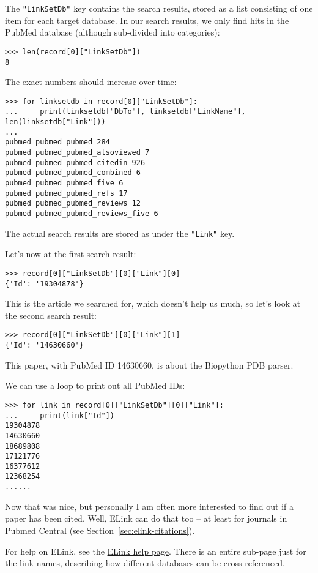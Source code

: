 The \verb+"LinkSetDb"+ key contains the search results, stored as a list consisting of one item for each target database. In our search results, we only find hits in the PubMed database (although sub-divided into categories):

\begin{verbatim}
>>> len(record[0]["LinkSetDb"])
8
\end{verbatim}
\noindent The exact numbers should increase over time:
\begin{verbatim}
>>> for linksetdb in record[0]["LinkSetDb"]:
...     print(linksetdb["DbTo"], linksetdb["LinkName"], len(linksetdb["Link"]))
...
pubmed pubmed_pubmed 284
pubmed pubmed_pubmed_alsoviewed 7
pubmed pubmed_pubmed_citedin 926
pubmed pubmed_pubmed_combined 6
pubmed pubmed_pubmed_five 6
pubmed pubmed_pubmed_refs 17
pubmed pubmed_pubmed_reviews 12
pubmed pubmed_pubmed_reviews_five 6
\end{verbatim}

The actual search results are stored as under the \verb+"Link"+ key.

Let's now at the first search result:
\begin{verbatim}
>>> record[0]["LinkSetDb"][0]["Link"][0]
{'Id': '19304878'}
\end{verbatim}

\noindent This is the article we searched for, which doesn't help us much, so let's look at the second search result:

\begin{verbatim}
>>> record[0]["LinkSetDb"][0]["Link"][1]
{'Id': '14630660'}
\end{verbatim}

\noindent This paper, with PubMed ID 14630660, is about the Biopython PDB parser.

We can use a loop to print out all PubMed IDs:
\begin{verbatim}
>>> for link in record[0]["LinkSetDb"][0]["Link"]:
...     print(link["Id"])
19304878
14630660
18689808
17121776
16377612
12368254
......
\end{verbatim}

Now that was nice, but personally I am often more interested to find out if a paper has been cited.
Well, ELink can do that too -- at least for journals in Pubmed Central (see Section~\ref{sec:elink-citations}).

For help on ELink, see the \href{https://www.ncbi.nlm.nih.gov/books/NBK25499/#chapter4.ELink}{ELink help page}.
There is an entire sub-page just for the \href{https://eutils.ncbi.nlm.nih.gov/corehtml/query/static/entrezlinks.html}{link names}, describing how different databases can be cross referenced.

